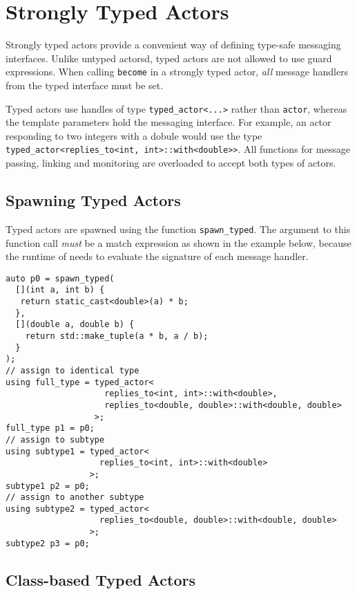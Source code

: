 \section{Strongly Typed Actors}

Strongly typed actors provide a convenient way of defining type-safe messaging interfaces.
Unlike untyped actorsd, typed actors are not allowed to use guard expressions.
When calling \lstinline^become^ in a strongly typed actor, \emph{all} message handlers from the typed interface must be set.

Typed actors use handles of type \lstinline^typed_actor<...>^ rather than \lstinline^actor^, whereas the template parameters hold the messaging interface.
For example, an actor responding to two integers with a dobule would use the type \lstinline^typed_actor<replies_to<int, int>::with<double>>^.
All functions for message passing, linking and monitoring are overloaded to accept both types of actors.

\subsection{Spawning Typed Actors}
\label{sec:strong:spawn}

Typed actors are spawned using the function \lstinline^spawn_typed^.
The argument to this function call \emph{must} be a match expression as shown in the example below, because the runtime of \lib needs to evaluate the signature of each message handler.

\begin{lstlisting}
auto p0 = spawn_typed(
  [](int a, int b) {
   return static_cast<double>(a) * b;
  },
  [](double a, double b) {
    return std::make_tuple(a * b, a / b);
  }
);
// assign to identical type
using full_type = typed_actor<
                    replies_to<int, int>::with<double>,
                    replies_to<double, double>::with<double, double>
                  >;
full_type p1 = p0;
// assign to subtype
using subtype1 = typed_actor<
                   replies_to<int, int>::with<double>
                 >;
subtype1 p2 = p0;
// assign to another subtype
using subtype2 = typed_actor<
                   replies_to<double, double>::with<double, double>
                 >;
subtype2 p3 = p0;
\end{lstlisting}

\clearpage
\subsection{Class-based Typed Actors}

